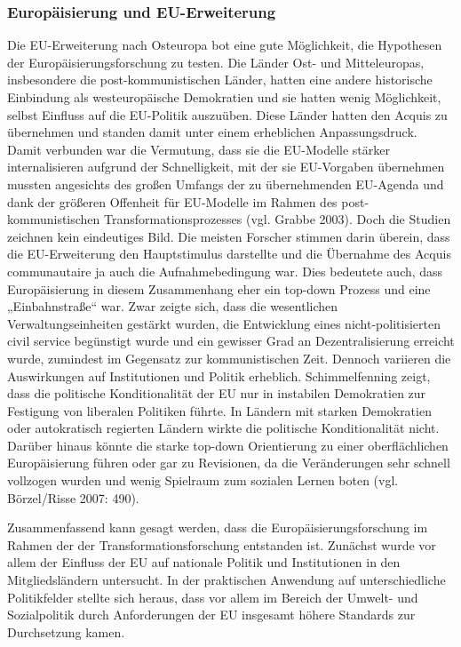 \subsubsection{Europäisierung und EU-Erweiterung }
Die EU-Erweiterung nach Osteuropa bot eine gute Möglichkeit, die Hypothesen der Europäisierungsforschung zu testen. Die Länder Ost- und Mitteleuropas, insbesondere die post-kommunistischen Länder, hatten eine andere historische Einbindung als westeuropäische Demokratien und sie hatten wenig Möglichkeit, selbst Einfluss auf die EU-Politik auszuüben. Diese Länder hatten den Acquis zu übernehmen und standen damit unter einem erheblichen Anpassungsdruck. Damit verbunden war die Vermutung, dass sie die EU-Modelle stärker internalisieren aufgrund der Schnelligkeit, mit der sie EU-Vorgaben übernehmen mussten angesichts des großen Umfangs der zu übernehmenden EU-Agenda und dank der größeren Offenheit für EU-Modelle im Rahmen des post-kommunistischen Transformationsprozesses (vgl. Grabbe 2003). Doch die Studien zeichnen kein eindeutiges Bild. Die meisten Forscher stimmen darin überein, dass die EU-Erweiterung den Hauptstimulus darstellte und die Übernahme des Acquis communautaire ja auch die Aufnahmebedingung war. Dies bedeutete auch, dass Europäisierung in diesem Zusammenhang eher ein top-down Prozess und eine „Einbahnstraße“ war. Zwar zeigte sich, dass die wesentlichen Verwaltungseinheiten gestärkt wurden, die Entwicklung eines nicht-politisierten civil service begünstigt wurde und ein gewisser Grad an Dezentralisierung erreicht wurde, zumindest im Gegensatz zur kommunistischen Zeit. Dennoch variieren die Auswirkungen auf Institutionen und Politik erheblich. Schimmelfenning zeigt, dass die politische Konditionalität der EU nur in instabilen Demokratien zur Festigung von liberalen Politiken führte. In Ländern mit starken Demokratien oder autokratisch regierten Ländern wirkte die politische Konditionalität nicht. Darüber hinaus könnte die starke top-down Orientierung zu einer oberflächlichen Europäisierung führen oder gar zu Revisionen, da die Veränderungen sehr schnell vollzogen wurden und wenig Spielraum zum sozialen Lernen boten (vgl. Börzel/Risse 2007: 490).\par
Zusammenfassend kann gesagt werden, dass die Europäisierungsforschung im Rahmen der der Transformationsforschung entstanden ist. Zunächst wurde vor allem der Einfluss der EU auf nationale Politik und Institutionen in den Mitgliedsländern untersucht. In der praktischen Anwendung auf unterschiedliche Politikfelder stellte sich heraus, dass vor allem im Bereich der Umwelt- und Sozialpolitik durch Anforderungen der EU insgesamt höhere Standards zur Durchsetzung kamen.
